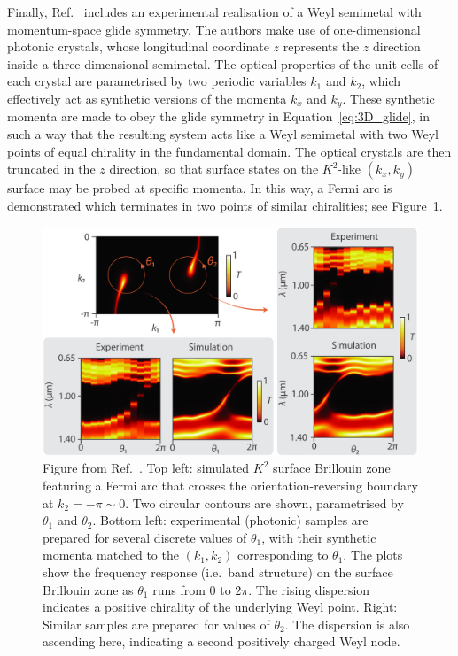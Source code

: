 Finally, Ref.~\cite{Fonseca-Vaidya_nonorientable} includes an experimental realisation of a Weyl semimetal with momentum-space glide symmetry. The authors make use of one-dimensional photonic crystals, whose longitudinal coordinate $z$ represents the $z$ direction inside a three-dimensional semimetal. The optical properties of the unit cells of each crystal are parametrised by two periodic variables $k_1$ and $k_2$, which effectively act as synthetic versions of the momenta $k_x$ and $k_y$. These synthetic momenta are made to obey the glide symmetry in Equation~\eqref{eq:3D_glide}, in such a way that the resulting system acts like a Weyl semimetal with two Weyl points of equal chirality in the fundamental domain. The optical crystals are then truncated in the $z$ direction, so that surface states on the $K^2$-like $(k_x,k_y)$ surface may be probed at specific momenta. In this way, a Fermi arc is demonstrated which terminates in two points of similar chiralities; see Figure~\ref{fig:K2-experiment}.
\begin{figure}[htb!]
	\centering
	\includegraphics[width=.9\linewidth]{Images/K2-experiment}
	\caption{Figure from Ref.~\cite{Fonseca-Vaidya_nonorientable}. Top left: simulated $K^2$ surface Brillouin zone featuring a Fermi arc that crosses the orientation-reversing boundary at $k_2=-\pi\sim 0$. Two circular contours are shown, parametrised by $\theta_1$ and $\theta_2$. Bottom left: experimental (photonic) samples are prepared for several discrete values of $\theta_1$, with their synthetic momenta matched to the $(k_1,k_2)$ corresponding to $\theta_1$. The plots show the frequency response (i.e.\ band structure) on the surface Brillouin zone as $\theta_1$ runs from $0$ to $2\pi$. The rising dispersion indicates a positive chirality of the underlying Weyl point. Right: Similar samples are prepared for values of $\theta_2$. The dispersion is also ascending here, indicating a second positively charged Weyl node.}
	\label{fig:K2-experiment}
\end{figure}


